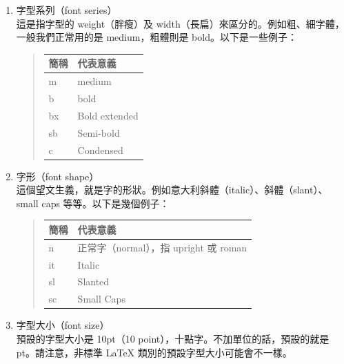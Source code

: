 \begin{enumerate}
   \item 字型系列（font series）\\
         這是指字型的 weight（胖瘦）及 width（長扁）來區分的。例如粗、細字體，一般我們正常用的是 medium，粗體則是 bold。以下是一些例子：

         \begin{quote}
            \begin{tabular}{>{\ttfamily}ll}
               簡稱 & 代表意義      \\
               \hline
               m    & medium        \\
               b    & bold          \\
               bx   & Bold extended \\
               sb   & Semi-bold     \\
               c    & Condensed
            \end{tabular}
         \end{quote}

   \item 字形（font shape）\\
         這個望文生義，就是字的形狀。例如意大利斜體（italic）、斜體（slant）、small caps 等等。以下是幾個例子：

         \begin{quote}
            \begin{tabular}{>{\ttfamily}ll}
               簡稱 & 代表意義                              \\
               \hline
               n    & 正常字（normal），指 upright 或 roman \\
               it   & Italic                                \\
               sl   & Slanted                               \\
               sc   & Small Caps                            \\
            \end{tabular}
         \end{quote}

   \item 字型大小（font size）\\
         預設的字型大小是 10pt（10 point），十點字。不加單位的話，預設的就是 pt。請注意，非標準 \LaTeX{} 類別的預設字型大小可能會不一樣。
\end{enumerate}

